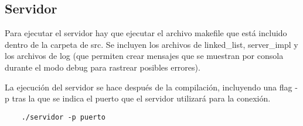 \subsection{Servidor}
Para ejecutar el servidor hay que ejecutar el archivo makefile que está incluido dentro de la carpeta de src. Se incluyen los archivos de linked\_list, server\_impl y los archivos de log (que permiten crear mensajes que se muestran por consola durante el modo debug para rastrear posibles errores).

La ejecución del servidor se hace después de la compilación, incluyendo una flag -p tras la que se indica el puerto que el servidor utilizará para la conexión.
\begin{lstlisting}
    ./servidor -p puerto
\end{lstlisting}